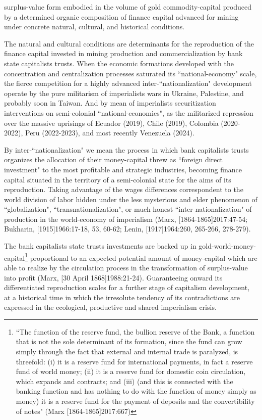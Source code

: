 \documentclass[]{interact}
\theoremstyle{plain}%
\theoremstyle{definition}
\theoremstyle{remark}
\begin{document}
surplus-value form embodied in the volume of gold commodity-capital produced by a determined organic composition of finance capital advanced for mining under concrete natural, cultural, and historical conditions. 

The natural and cultural conditions are determinants for the reproduction of the finance capital invested in mining production and commercialization by bank state capitalists trusts. When the economic formations developed with the concentration and centralization processes saturated its “national-economy" scale, the fierce competition for a highly advanced inter-“nationalization" development operate by the pure militarism of imperialists wars in Ukraine, Palestine, and probably soon in Taiwan. And by mean of imperialists securitization interventions on semi-colonial “national-economies", as the militarized repression over the massive uprisings of Ecuador (2019), Chile (2019), Colombia (2020-2022), Peru (2022-2023), and most recently Venezuela (2024).

By inter-“nationalization" we mean the process in which bank capitalists trusts organizes the allocation of their money-capital threw as “foreign direct investment" to the most profitable and strategic industries, becoming finance capital situated in the territory of a semi-colonial state for the aims of its reproduction. Taking advantage of the wages differences correspondent to the world division of labor hidden under the less mysterious and elder phenomenon of “globalization", “transnationalization", or much honest “inter-nationalization" of production in the world-economy of imperialism (Marx, [1864-1865]2017:47-54; Bukharin, [1915]1966:17-18, 53, 60-62; Lenin, [1917]1964:260, 265-266, 278-279).

The bank capitalists state trusts investments are backed up in gold-world-money-capital\footnote{“The function of the reserve fund, the bullion reserve of the Bank, a  function that is not the sole determinant of its formation, since the fund can  grow simply through the fact that external and internal trade is paralyzed, is  threefold: (i) it is a reserve fund for international payments, in fact a reserve  fund of world money; (ii) it is a reserve fund for domestic coin circulation, which  expands and contracts; and (iii) (and this is connected with the banking function and has nothing to do with the function of money simply as money) it is a  reserve fund for the payment of deposits and the convertibility of notes" (Marx [1864-1865]2017:667)} proportional to an expected potential amount of money-capital which are able to realize by the circulation process in the transformation of surplus-value into profit (Marx, [30 April 1868]1988:21-24). Guaranteeing onward its differentiated reproduction scales for a further stage of capitalism development, at a historical time in which the irresolute tendency of its contradictions are expressed in the ecological, productive and shared imperialism crisis.
\end{document}
